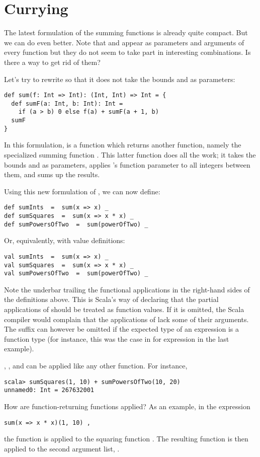 \section{Currying}

The latest formulation of the summing functions is already quite
compact. But we can do even better. Note that
 and  appear as parameters and arguments of every function
but they do not seem to take part in interesting combinations. Is
there a way to get rid of them?

Let's try to rewrite  so that it does not take the bounds
 and  as parameters:
\begin{lstlisting}
def sum(f: Int => Int): (Int, Int) => Int = {
  def sumF(a: Int, b: Int): Int =
    if (a > b) 0 else f(a) + sumF(a + 1, b)
  sumF
}
\end{lstlisting}
In this formulation,  is a function which returns another
function, namely the specialized summing function . This
latter function does all the work; it takes the bounds  and
 as parameters, applies 's function parameter  to all
integers between them, and sums up the results. 

Using this new formulation of , we can now define:
\begin{lstlisting}
def sumInts  =  sum(x => x) _
def sumSquares  =  sum(x => x * x) _
def sumPowersOfTwo  =  sum(powerOfTwo) _
\end{lstlisting}
Or, equivalently, with value definitions:
\begin{lstlisting}
val sumInts  =  sum(x => x) _
val sumSquares  =  sum(x => x * x) _
val sumPowersOfTwo  =  sum(powerOfTwo) _
\end{lstlisting}
Note the underbar trailing the functional applications in the 
right-hand sides of the definitions above.  This is Scala's way of declaring
that the partial applications of  should be treated as 
function values. If it is omitted, the Scala compiler would complain that
the applications of  lack some of their arguments. The
\code{_} suffix can however be omitted if the expected type of an
expression is a function type (for instance, this was the case in for 
expression in the last example).

, , and  can be
applied like any other function. For instance,
\begin{lstlisting}
scala> sumSquares(1, 10) + sumPowersOfTwo(10, 20)
unnamed0: Int = 267632001
\end{lstlisting}
How are function-returning functions applied? As an example, in the expression
\begin{lstlisting}
sum(x => x * x)(1, 10) ,
\end{lstlisting}
the function  is applied to the squaring function 
. The resulting function is then 
applied to the second argument list, .

